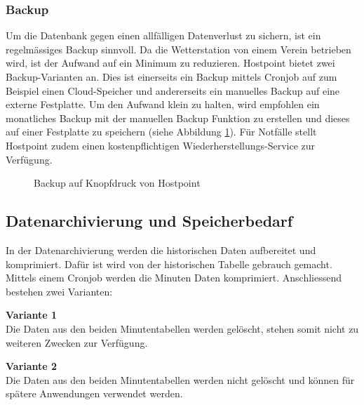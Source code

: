 \subsubsection{Backup}
Um die Datenbank gegen einen allfälligen Datenverlust zu sichern, ist ein regelmässiges Backup sinnvoll. Da die Wetterstation von einem Verein betrieben wird, ist der Aufwand auf ein Minimum zu reduzieren. Hostpoint bietet zwei Backup-Varianten an. Dies ist einerseits ein Backup mittels Cronjob auf zum Beispiel einen Cloud-Speicher und andererseits ein manuelles Backup auf eine externe Festplatte. Um den Aufwand klein zu halten, wird empfohlen ein monatliches Backup mit der manuellen Backup Funktion zu erstellen und dieses auf einer Festplatte zu speichern (siehe Abbildung \ref{img:backup}). Für Notfälle stellt Hostpoint zudem einen kostenpflichtigen Wiederherstellungs-Service zur Verfügung.

\begin{figure}[htbp!]
	\centering
	\caption{Backup auf Knopfdruck von Hostpoint}
	\label{img:backup}
\end{figure}


\subsection{Datenarchivierung und Speicherbedarf}
In der Datenarchivierung werden die historischen Daten aufbereitet und komprimiert. Dafür ist wird von der historischen Tabelle gebrauch gemacht. Mittels einem Cronjob werden die Minuten Daten komprimiert. Anschliessend bestehen zwei Varianten:

\begin{itemize*}
\item \textbf{Variante 1}\\
Die Daten aus den beiden Minutentabellen werden gelöscht, stehen somit nicht zu weiteren Zwecken zur Verfügung.
\item \textbf{Variante 2}\\
Die Daten aus den beiden Minutentabellen werden nicht gelöscht und können für spätere Anwendungen verwendet werden.
\end{itemize*}

